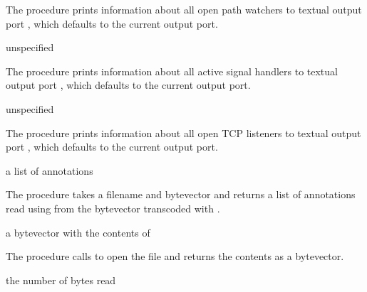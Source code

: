 The  procedure prints information about all
open path watchers to textual output port
, which defaults to the current output port.

\begin{procedure}
\end{procedure}
\returns{} unspecified

The  procedure prints information about all
active signal handlers to textual output port
, which defaults to the current output port.

\begin{procedure}
\end{procedure}
\returns{} unspecified

The  procedure prints information about all
open TCP listeners to textual output port
, which defaults to the current output port.

\begin{procedure}
\end{procedure}
\returns{} a list of annotations

The  procedure takes a filename  and
 bytevector and returns a list of annotations read using
 from the  bytevector
transcoded with .

\begin{procedure}
\end{procedure}
\returns{} a bytevector with the contents of 

The  procedure calls  to open the file  and returns the contents
as a bytevector.

\begin{procedure}
\end{procedure}
\returns{} the number of bytes read

